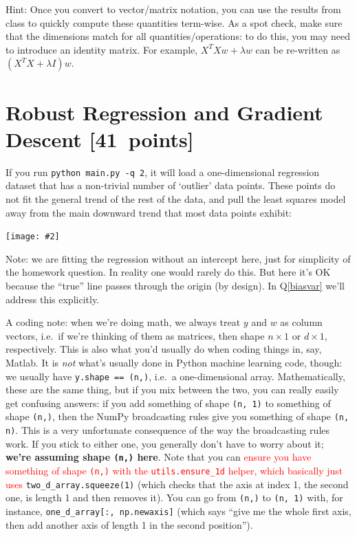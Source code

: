 \documentclass{article}
\newcommand{\red}[1]{\textcolor{red}{#1}}
\let\update\red
\newcommand\pts[1]{\textcolor{pointscolour}{[#1~points]}}
\newcommand{\centerfig}[2]{\begin{center}\texttt{[image: \#2]}\end{center}}
\begin{document}
Hint: Once you convert to vector/matrix notation, you can use the results from class to quickly compute these quantities term-wise.
As a spot check, make sure that the dimensions match for all quantities/operations: to do this, you may need to introduce an identity matrix. For example, $X^T X w + \lambda w$ can be re-written as $(X^T X + \lambda I)w$.


\clearpage
\section{Robust Regression and Gradient Descent \pts{41}}

If you run \verb|python main.py -q 2|, it will load a one-dimensional regression
dataset that has a non-trivial number of `outlier' data points.
These points do not fit the general trend of the rest of the data,
and pull the least squares model away from the main downward trend that most data points exhibit:
\centerfig{.7}{./figs/least_squares_outliers.pdf}

Note: we are fitting the regression without an intercept here, just for simplicity of the homework question.
In reality one would rarely do this. But here it's OK because the ``true'' line
passes through the origin (by design). In Q\ref{biasvar} we'll address this explicitly.

A coding note:
when we're doing math, we always treat $y$ and $w$ as column vectors,
i.e.\ if we're thinking of them as matrices, then shape $n \times 1$ or $d \times 1$, respectively.
This is also what you'd usually do when coding things in, say, Matlab.
It is \emph{not} what's usually done in Python machine learning code, though:
we usually have \verb|y.shape == (n,)|, i.e.\ a one-dimensional array.
Mathematically, these are the same thing, but if you mix between the two,
you can really easily get confusing answers:
if you add something of shape \texttt{(n, 1)} to something of shape \texttt{(n,)},
then the NumPy broadcasting rules give you something of shape \texttt{(n, n)}.
This is a very unfortunate consequence of the way the broadcasting rules work.
If you stick to either one, you generally don't have to worry about it;
\textbf{we're assuming shape \texttt{(n,)} here}.
Note that you can
\update{ensure you have something of shape \texttt{(n,)} with the \texttt{utils.ensure\_1d} helper, which basically just uses}
\texttt{two\_d\_array.squeeze(1)}
(which checks that the axis at index 1, the second one, is length 1 and then removes it).
You can go from \texttt{(n,)} to \texttt{(n, 1)} with, for instance, \texttt{one\_d\_array[:, np.newaxis]}
(which says ``give me the whole first axis, then add another axis of length 1 in the second position'').
\end{document}
